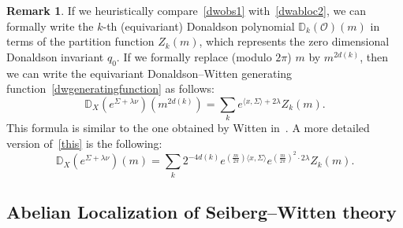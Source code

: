 \documentclass[a4paper,12pt,reqno,sumlimits]{amsart}
\theoremstyle{plain}
\theoremstyle{definition}
\newtheorem{rem}[thm]{Remark}
\newcommand{\D}{{\mathbb D}}
\newcommand{\1}{{\bf 1}}
\newcommand{\calO}{{\mathcal O}}
\newcommand{\ip}[1]{\langle #1 \rangle}
\numberwithin{equation}{section}
\begin{document}
\begin{rem}
  \label{dwrem}
  If we heuristically compare~\eqref{dwobs1} with~\eqref{dwabloc2}, we can
  formally write the $k$-th (equivariant) Donaldson polynomial
  $\D_k(\calO)(m)$ in terms of the partition function $Z_k(m)$, which
  represents the zero dimensional Donaldson invariant $q_0$. If we formally
  replace (modulo $2\pi$) $m$ by $m^{2d(k)}$, then we can write the
  equivariant Donaldson--Witten generating
  function~\eqref{dwgeneratingfunction} as follows:
  \begin{equation}
    \label{this}
    \D_X(e^{\Sigma+\lambda\nu})(m^{2d(k)})=\sum_k e^{\ip{x,\Sigma}+2\lambda} Z_k(m).
  \end{equation}
  This formula is similar to the one obtained by Witten
  in~\cite[(2.36)]{ewdon2}. A more detailed version of~\eqref{this} is the
  following:
  $$
  \D_X(e^{\Sigma+\lambda\nu})(m)=\sum_k 2^{-4d(k)}
  e^{\left(\frac{m}{2\pi}\right)\ip{x,\Sigma}}
  e^{\left(\frac{m}{2\pi}\right)^2\cdot 2\lambda} Z_k(m).
  $$
\end{rem}




\subsection{Abelian Localization of Seiberg--Witten theory}
\label{chswabloc}
\end{document}

